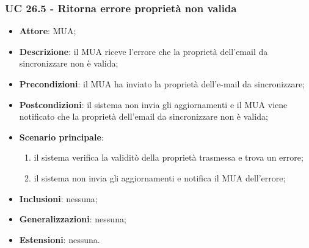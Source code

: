     \subsubsection{UC 26.5 - Ritorna errore proprietà non valida} \label{sec:UC26.5}
    \begin{itemize}
        \item \textbf{Attore}: MUA;
        \item \textbf{Descrizione}: il MUA riceve l'errore che la proprietà dell'email da sincronizzare non è valida;
        \item \textbf{Precondizioni}: il MUA ha inviato la proprietà dell'e-mail da sincronizzare;
        \item \textbf{Postcondizioni}: il sistema non invia gli aggiornamenti e il MUA viene notificato che la proprietà dell'email da sincronizzare non è valida;
        \item \textbf{Scenario principale}:
            \begin{enumerate}
                \item il sistema verifica la validitò della proprietà trasmessa e trova un errore;
                \item il sistema non invia gli aggiornamenti e notifica il MUA dell'errore;
            \end{enumerate}
        \item \textbf{Inclusioni}: nessuna;
        \item \textbf{Generalizzazioni}: nessuna;
        \item \textbf{Estensioni}: nessuna.
    \end{itemize}